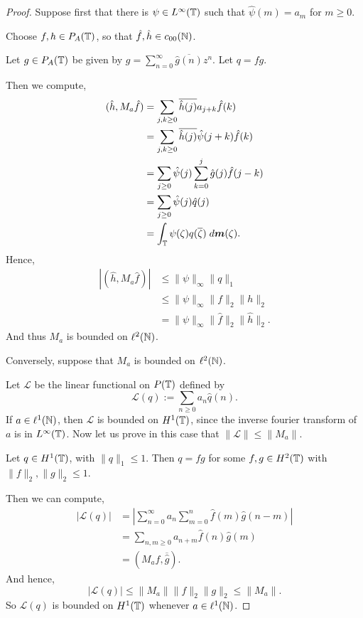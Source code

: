\begin{proof}
    Suppose first that there is $\psi \in L^\infty(\mathbb{T})$
    such that $\hat{\psi}(m) = a_m$ for $m\geq 0$. 
    
    Choose $f,h \in P_A(\mathbb{T})$, so that $\hat{f},\hat{h} \in c_{00}(\mathbb{N})$.
    
    Let $g \in P_A(\mathbb{T})$ be given by $g = \sum_{n=0}^\infty \overline{\hat{g}(n)}z^n$.
    Let $q = fg$.
    
    Then we compute,
    \begin{align*}
        (\hat{h},M_a\hat{f}) &= \sum_{j,k \geq 0} \overline{\hat{h}(j)}a_{j+k}\hat{f}(k)\\
        &= \sum_{j,k\geq 0} \overline{\hat{h}(j)}\hat{\psi}(j+k)\hat{f}(k)\\
        &= \sum_{j \geq 0} \hat{\psi}(j) \sum_{k=0}^j \hat{g}(j)\hat{f}(j-k)\\
        &= \sum_{j \geq 0} \hat{\psi}(j) \hat{q}(j)\\
        &= \int_{\mathbb{T}} \psi(\zeta) q(\overline{\zeta}) \;d\boldsymbol{m}(\zeta).
    \end{align*}
    Hence,
    \begin{align*}
        |(\hat{h},M_a\hat{f})| &\leq \|\psi\|_{\infty} \|q\|_1\\
                               &\leq \|\psi\|_\infty \|f\|_2 \|h\|_2\\
                               &= \|\psi\|_\infty \|\hat{f}\|_2\|\hat{h}\|_2.
    \end{align*}
    And thus $M_a$ is bounded on $\ell^2(\mathbb{N})$.
    
    Conversely, suppose that $M_a$ is bounded on $\ell^2(\mathbb{N})$. 
    
    Let $\mathcal{L}$ be the linear functional on $P(\mathbb{T})$ defined by
    \begin{equation*}
        \mathcal{L}(q) := \sum_{n\geq 0} a_n \hat{q}(n).
    \end{equation*}
    If $a \in \ell^1(\mathbb{N})$, then $\mathcal{L}$ is bounded on $H^1(\mathbb{T})$,
    since the inverse fourier transform of $a$ is in $L^\infty(\mathbb{T})$. 
    Now let us prove in this case that $\|\mathcal{L}\| \leq \|M_a\|$. 
    
    Let $q \in H^1(\mathbb{T})$, with $\|q\|_1 \leq 1$. Then $q = fg$
    for some $f,g \in H^2(\mathbb{T})$ with $\|f\|_2,\|g\|_2 \leq 1$. 
    
    Then we can compute,
    \begin{align*} 
        |\mathcal{L}(q)| &= \left|\sum_{n=0}^\infty a_n \sum_{m=0}^n \hat{f}(m)\hat{g}(n-m)\right|\\
        &= \sum_{n,m\geq 0} a_{n+m} \hat{f}(n) \hat{g}(m)\\
        &= (M_a \hat{f},\overline{\hat{g}}). 
    \end{align*}
    And hence,
    \begin{equation*}
        |\mathcal{L}(q)| \leq \|M_a\|\|f\|_2\|g\|_2 \leq \|M_a\|.
    \end{equation*}
    So $\mathcal{L}(q)$ is bounded on $H^1(\mathbb{T})$ whenever $a \in \ell^1(\mathbb{N})$. 
    

\end{proof}
